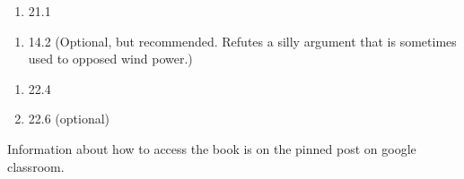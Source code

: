 \documentclass[12pt]{article}
\begin{document}
\begin{enumerate}
  \setlength{\itemsep}{-1mm}
\item 21.1
\end{enumerate}

\begin{enumerate}
  \setlength{\itemsep}{-1mm}
\item 14.2 (Optional, but recommended. Refutes a silly argument that
  is sometimes used to opposed wind power.)
\end{enumerate}

\begin{enumerate}
  \setlength{\itemsep}{-1mm}
\item 22.4
\item 22.6 (optional)\\
\end{enumerate}



\noindent Information about how to access the book is on the
pinned post on google classroom. 
\end{document}
